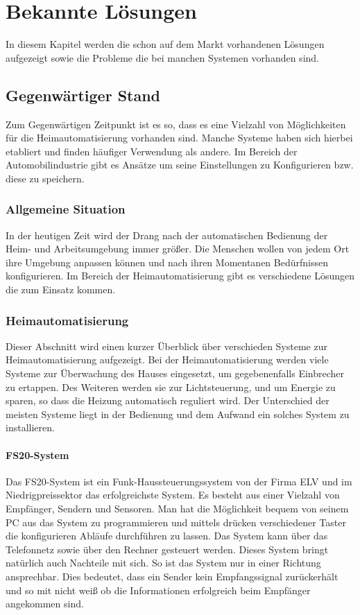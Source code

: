 \chapter{Bekannte Lösungen}
In diesem Kapitel werden die schon auf dem Markt vorhandenen Lösungen aufgezeigt sowie die Probleme die bei manchen Systemen vorhanden sind.

\section{Gegenwärtiger Stand}
Zum Gegenwärtigen Zeitpunkt ist es so, dass es eine Vielzahl von Möglichkeiten für die Heimautomatisierung vorhanden sind. 
Manche Systeme haben sich hierbei etabliert und finden häufiger Verwendung als andere. Im Bereich der Automobilindustrie gibt es Ansätze um seine Einstellungen zu Konfigurieren bzw. diese zu speichern.  

\subsection{Allgemeine Situation}
In der heutigen Zeit wird der Drang nach der automatischen Bedienung der Heim- und Arbeitsumgebung immer größer. Die Menschen wollen von jedem Ort ihre Umgebung anpassen können und nach ihren Momentanen Bedürfnissen konfigurieren. Im Bereich der Heimautomatisierung gibt es verschiedene Lösungen die zum 
Einsatz kommen. 

\subsection{Heimautomatisierung}
Dieser Abschnitt wird einen kurzer Überblick über verschieden Systeme zur Heimautomatisierung aufgezeigt. Bei der Heimautomatisierung werden viele Systeme zur Überwachung des Hauses eingesetzt, um gegebenenfalls Einbrecher zu ertappen. Des Weiteren werden sie zur Lichtsteuerung, und um Energie zu sparen, so dass die Heizung automatisch reguliert wird. Der Unterschied der meisten Systeme liegt in der Bedienung und dem Aufwand ein solches System zu installieren.  

\subsubsection{FS20-System}
Das FS20-System ist ein Funk-Haussteuerungssystem von der Firma ELV und im Niedrigpreissektor das erfolgreichste System. Es besteht aus einer Vielzahl von Empfänger, Sendern und Sensoren. Man hat die Möglichkeit bequem von seinem PC aus das System zu programmieren und mittels drücken verschiedener Taster die konfigurieren Abläufe durchführen zu lassen. Das System kann über das Telefonnetz sowie über den Rechner gesteuert werden. Dieses System bringt natürlich auch Nachteile mit sich. So ist das System nur in einer Richtung ansprechbar. Dies bedeutet, dass ein Sender kein Empfangssignal zurückerhält 
und so mit nicht weiß ob die Informationen erfolgreich beim Empfänger angekommen sind. 

